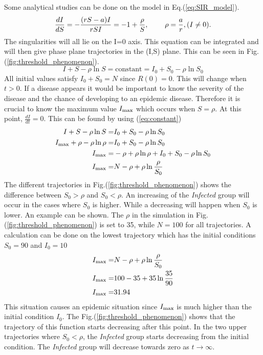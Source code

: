 \documentclass[%
twoside,                 %
final,                   %
chapterprefix=true,      %
open=right               %
10pt]{book}
\begin{document}
Some analytical studies can be done on the model in Eq.(\ref{eq:SIR_model}).
\begin{equation} 
\frac{dI}{dS} = -\frac{(rS-a)I}{rSI} = -1 + \frac{\rho}{S},\hspace{8mm}\rho=\frac{a}{r}, (I\neq0).
\end{equation}
The singularities will all lie on the I=0 axis. This equation can be integrated and will then give phase plane trajectories in the (I,S) plane. This can be seen in Fig.(\ref{fig:threshold_phenomenon}).
\begin{equation} \label{eq:constant}
I+S-\rho \ln S = \textrm{constant} = I_0 + S_0 - \rho \ln S_0
\end{equation}
All initial values satisfy $I_0+S_0=N$ since $R(0) = 0$. This will change when $t>0$. If a disease appears it would be important to know the severity of the disease and the chance of developing to an epidemic disease. Therefore it is crucial to know the maximum value $I_{\textrm{max}}$ which occurs when $S=\rho$. At this point, $\frac{dI}{dt}=0$. This can be found by using (\ref{eq:constant})
\begin{align} 
I+S-\rho \ln S =& I_0 + S_0 - \rho \ln S_0 \nonumber \\
I_{\textrm{max}}+\rho-\rho \ln \rho =& I_0 + S_0 - \rho \ln S_0\nonumber \\
I_{\textrm{max}}=&- \rho+\rho \ln \rho + I_0 + S_0 - \rho \ln S_0\nonumber \\
I_{\textrm{max}}=&N - \rho + \rho \ln\frac{\rho}{S_0} \label{eq:max_I}
\end{align}
The different trajectories in Fig.(\ref{fig:threshold_phenomenon}) shows the difference between $S_0 > \rho$ and $S_0 < \rho$. An increasing of the \emph{Infected} group will occur in the cases where $S_0$ is higher. While a decreasing will happen when $S_0$ is lower. An example can be shown. The $\rho$ in the simulation in Fig.(\ref{fig:threshold_phenomenon}) is set to 35, while $N=100$ for all trajectories. A calculation can be done on the lowest trajectory which has the initial conditions $S_0= 90$ and $I_0= 10$
\begin{align*}
I_{\textrm{max}} =& N-\rho + \rho \ln \frac{\rho}{S_0}\\
I_{\textrm{max}} =& 100-35 + 35 \ln \frac{35}{90}\\
I_{\textrm{max}} =& 31.94
\end{align*}
This situation causes an epidemic situation since $I_{\textrm{max}}$ is much higher than the initial condition $I_0$. The Fig.(\ref{fig:threshold_phenomenon}) shows that the trajectory of this function starts decreasing after this point. In the two upper trajectories where $S_0 < \rho$, the \emph{Infected} group starts decreasing from the initial condition. The \emph{Infected} group will decrease towards zero as $t\rightarrow \infty$.
\end{document}
